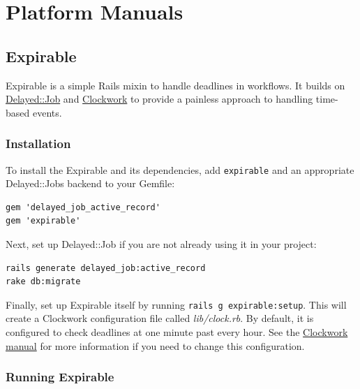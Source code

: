\documentclass[document.tex]{subfiles}
\begin{document}
\chapter{Platform Manuals}
\label {ch:appendix-manuals}



\section{Expirable}
\label {sec:expirable-manual}

Expirable is a simple Rails mixin to handle deadlines in workflows.
It builds on \href{https://github.com/collectiveidea/delayed\_job}{Delayed::Job}
and \href{https://github.com/tomykaira/clockwork}{Clockwork} to provide a painless approach
to handling time-based events.

\subsection{Installation}

To install the Expirable and its dependencies, add {\tt expirable} and an
appropriate Delayed::Jobs backend to your Gemfile:

\begin{lstlisting}
gem 'delayed_job_active_record'
gem 'expirable'

\end{lstlisting}   %

Next, set up Delayed::Job if you are not already using it in your project:

\begin{lstlisting}
rails generate delayed_job:active_record
rake db:migrate

\end{lstlisting}   %

Finally, set up Expirable itself by running {\tt rails g expirable:setup}.
This will create a Clockwork configuration file called \emph{lib/clock.rb}.
By default, it is configured to check deadlines at one minute past every hour.
See the \href{https://github.com/tomykaira/clockwork\#clockwork---a-clock-process-to-replace-cron--}{Clockwork manual}
for more information if you need to change this configuration.

\subsection{Running Expirable}
\end{document}
